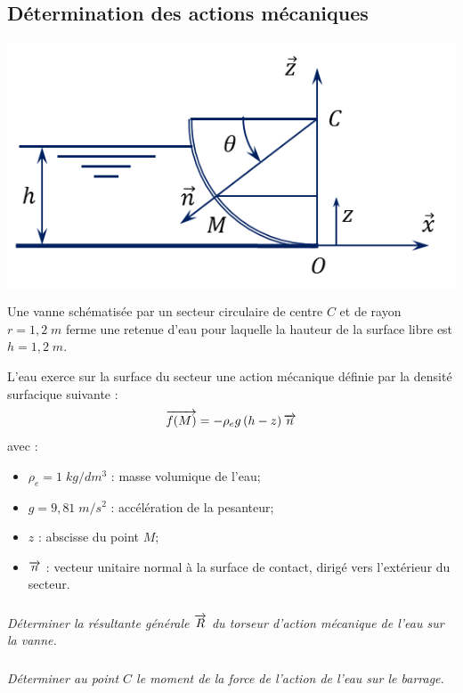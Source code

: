\documentclass[10pt]{article}
\begin{document}
\subsection*{Détermination des actions mécaniques}
\setcounter{subparagraph}{0}
\begin{minipage}[c]{.45\linewidth}
\begin{center}
\includegraphics[width=\textwidth]{images/vanne}
\end{center}
\end{minipage} \hfill
\begin{minipage}[c]{.52\linewidth}
Une vanne schématisée par un secteur circulaire de centre $C$ et de rayon $r=1,2\; m$ ferme une retenue d'eau pour laquelle la hauteur de la surface libre est $h=1,2\; m$.

L'eau exerce sur la surface du secteur une action mécanique définie par la densité surfacique suivante : 
$$
\overrightarrow{f(M)} = -\rho_e g\left(h-z\right)\overrightarrow{n}
$$
avec :
\begin{itemize}
\item $\rho_e = 1 \; kg/dm^3$ : masse volumique de l'eau;
\item $g = 9,81\; m/s^2$ : accélération de la pesanteur;
\item $z$ : abscisse du point $M$;
\item $\overrightarrow{n}$ : vecteur unitaire normal à la surface de contact, dirigé vers l'extérieur du secteur.
\end{itemize}
\end{minipage}

\subparagraph{}
\textit{Déterminer la résultante générale $\overrightarrow{R}$ du torseur d'action mécanique de l'eau sur la vanne.}
\subparagraph{}
\textit{Déterminer au point $C$ le moment de la force de l'action de l'eau sur le barrage.}
\end{document}

